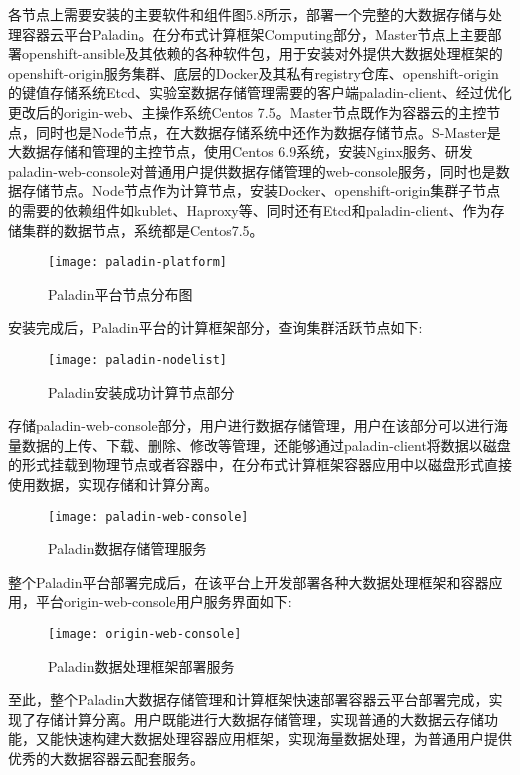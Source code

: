 各节点上需要安装的主要软件和组件图5.8所示，部署一个完整的大数据存储与处理容器云平台Paladin。在分布式计算框架Computing部分，Master节点上主要部署openshift-ansible及其依赖的各种软件包，用于安装对外提供大数据处理框架的openshift-origin服务集群、底层的Docker及其私有registry仓库、openshift-origin的键值存储系统Etcd、实验室数据存储管理需要的客户端paladin-client、经过优化更改后的origin-web、主操作系统Centos 7.5。Master节点既作为容器云的主控节点，同时也是Node节点，在大数据存储系统中还作为数据存储节点。S-Master是大数据存储和管理的主控节点，使用Centos 6.9系统，安装Nginx服务、研发paladin-web-console对普通用户提供数据存储管理的web-console服务，同时也是数据存储节点。Node节点作为计算节点，安装Docker、openshift-origin集群子节点的需要的依赖组件如kublet、Haproxy等、同时还有Etcd和paladin-client、作为存储集群的数据节点，系统都是Centos7.5。
\begin{figure}[H] %
	\centering
	\texttt{[image: paladin-platform]}
	\caption{Paladin平台节点分布图}
\end{figure}

安装完成后，Paladin平台的计算框架部分，查询集群活跃节点如下:
\begin{figure}[H] %
	\centering
	\texttt{[image: paladin-nodelist]}
	\caption{Paladin安装成功计算节点部分}
\end{figure}

存储paladin-web-console部分，用户进行数据存储管理，用户在该部分可以进行海量数据的上传、下载、删除、修改等管理，还能够通过paladin-client将数据以磁盘的形式挂载到物理节点或者容器中，在分布式计算框架容器应用中以磁盘形式直接使用数据，实现存储和计算分离。
\begin{figure}[H] %
	\centering
	\texttt{[image: paladin-web-console]}
	\caption{Paladin数据存储管理服务}
\end{figure}

整个Paladin平台部署完成后，在该平台上开发部署各种大数据处理框架和容器应用，平台origin-web-console用户服务界面如下:
\begin{figure}[H] %
	\centering
	\texttt{[image: origin-web-console]}
	\caption{Paladin数据处理框架部署服务}
\end{figure}

至此，整个Paladin大数据存储管理和计算框架快速部署容器云平台部署完成，实现了存储计算分离。用户既能进行大数据存储管理，实现普通的大数据云存储功能，又能快速构建大数据处理容器应用框架，实现海量数据处理，为普通用户提供优秀的大数据容器云配套服务。

